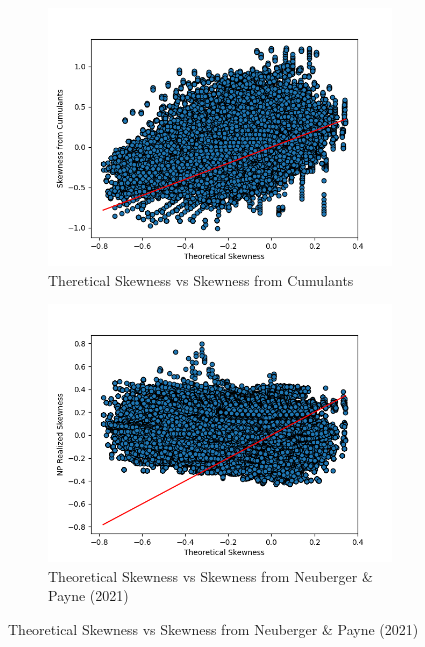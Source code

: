 \begin{figure}
    \centering
    \begin{subfigure}[b]{0.4\textwidth}
        \centering
        \includegraphics[width=\textwidth]{img/theoretical_skewness_vs_skewness_from_cumulants_feller_condition_true.png}
        \caption{Theretical Skewness vs Skewness from Cumulants}
    \end{subfigure}
    \hfill
    \begin{subfigure}[b]{0.4\textwidth}
        \centering
        \includegraphics[width=\textwidth]{img/theoretical_skewness_vs_NP_rskewness_feller_condition_true.png}
        \caption{Theoretical Skewness vs Skewness from Neuberger \& Payne (2021)}
    \end{subfigure}

\end{figure}
